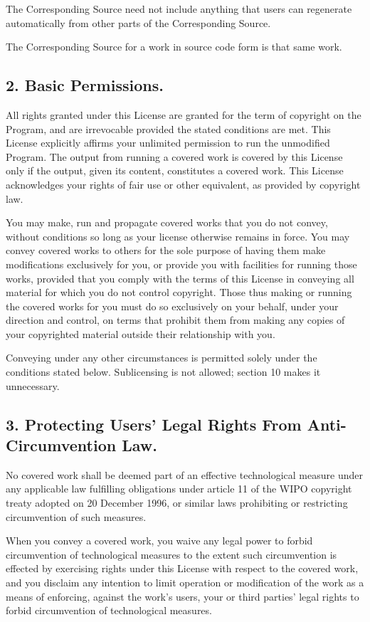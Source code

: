 \documentclass[letterpaper,10pt,english]{sphinxmanual}
\begin{document}
The Corresponding Source need not include anything that users
can regenerate automatically from other parts of the Corresponding
Source.

The Corresponding Source for a work in source code form is that
same work.


\subsection{2. Basic Permissions.}
\label{license:basic-permissions}
All rights granted under this License are granted for the term of
copyright on the Program, and are irrevocable provided the stated
conditions are met.  This License explicitly affirms your unlimited
permission to run the unmodified Program.  The output from running a
covered work is covered by this License only if the output, given its
content, constitutes a covered work.  This License acknowledges your
rights of fair use or other equivalent, as provided by copyright law.

You may make, run and propagate covered works that you do not
convey, without conditions so long as your license otherwise remains
in force.  You may convey covered works to others for the sole purpose
of having them make modifications exclusively for you, or provide you
with facilities for running those works, provided that you comply with
the terms of this License in conveying all material for which you do
not control copyright.  Those thus making or running the covered works
for you must do so exclusively on your behalf, under your direction
and control, on terms that prohibit them from making any copies of
your copyrighted material outside their relationship with you.

Conveying under any other circumstances is permitted solely under
the conditions stated below.  Sublicensing is not allowed; section 10
makes it unnecessary.


\subsection{3. Protecting Users' Legal Rights From Anti-Circumvention Law.}
\label{license:protecting-users-legal-rights-from-anti-circumvention-law}
No covered work shall be deemed part of an effective technological
measure under any applicable law fulfilling obligations under article
11 of the WIPO copyright treaty adopted on 20 December 1996, or
similar laws prohibiting or restricting circumvention of such
measures.

When you convey a covered work, you waive any legal power to forbid
circumvention of technological measures to the extent such circumvention
is effected by exercising rights under this License with respect to
the covered work, and you disclaim any intention to limit operation or
modification of the work as a means of enforcing, against the work's
users, your or third parties' legal rights to forbid circumvention of
technological measures.
\end{document}
